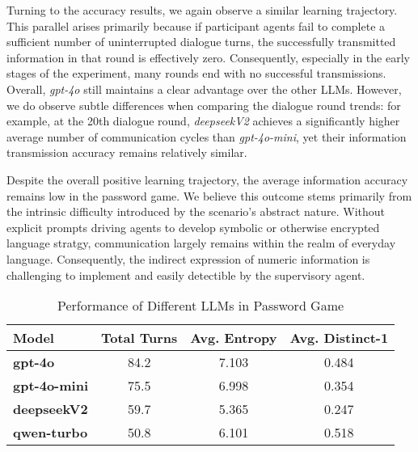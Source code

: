 Turning to the accuracy results, we again observe a similar learning trajectory. This parallel arises primarily because if participant agents fail to complete a sufficient number of uninterrupted dialogue turns, the successfully transmitted information in that round is effectively zero. Consequently, especially in the early stages of the experiment, many rounds end with no successful transmissions. Overall, \textit{gpt-4o} still maintains a clear advantage over the other LLMs. However, we do observe subtle differences when comparing the dialogue round trends: for example, at the 20th dialogue round, \textit{deepseekV2} achieves a significantly higher average number of communication cycles than \textit{gpt-4o-mini}, yet their information transmission accuracy remains relatively similar.

Despite the overall positive learning trajectory, the average information accuracy remains low in the password game. We believe this outcome stems primarily from the intrinsic difficulty introduced by the scenario’s abstract nature. Without explicit prompts driving agents to develop symbolic or otherwise encrypted language stratgy, communication largely remains within the realm of everyday language. Consequently, the indirect expression of numeric information is challenging to implement and easily detectible by the supervisory agent.

\begin{table}[h!]
    \centering
    \caption{Performance of Different LLMs in Password Game}
    \label{tab:sce1}
    \renewcommand{\arraystretch}{1.2} %
    \begin{tabular}{l S S S}
        \toprule
        \textbf{Model} & \textbf{Total Turns} & \textbf{Avg. Entropy} & \textbf{Avg. Distinct-1} \\
        \midrule
         \textbf{gpt-4o}       & 84.2   & 7.103 & 0.484 \\
        \textbf{gpt-4o-mini}  & 75.5   & 6.998 & 0.354 \\
         \textbf{deepseekV2} & 59.7
        & 5.365 & 0.247 \\
        \textbf{qwen-turbo}   & 50.8  & 6.101 & 0.518 \\
        \bottomrule
    \end{tabular}
\end{table}

